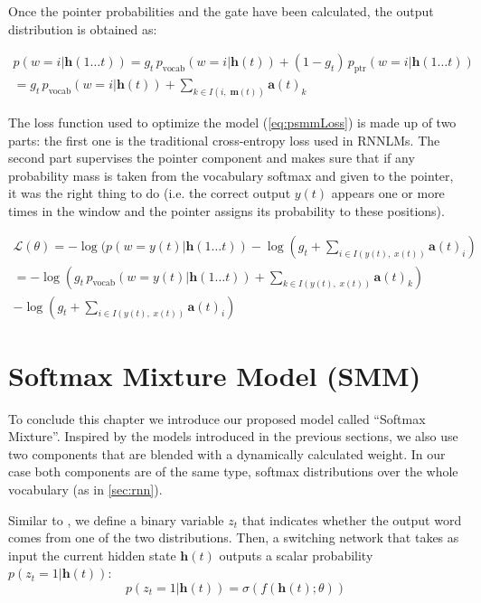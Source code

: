 Once the pointer probabilities and the gate have been calculated, the output distribution is obtained as:

\begin{equation}
	\begin{gathered}
		p(w=i|\mathbf{h}(1\ldots t)) = g_t \, p_{\text{vocab}}(w=i|\mathbf{h}(t)) + (1-g_t) \, p_{\text{ptr}}(w=i|\mathbf{h}(1\ldots t)) \\
		= g_t \, p_{\text{vocab}}(w=i|\mathbf{h}(t)) + \sum_{k \in I(i, \; \mathbf{m}(t))}\mathbf{a}(t)_k
	\end{gathered}
\end{equation}

The loss function used to optimize the model (\autoref{eq:psmmLoss}) is made up of two parts: the first one is the traditional cross-entropy loss used in RNNLMs. The second part supervises the pointer component and makes sure that if any probability mass is taken from the vocabulary softmax and given to the pointer, it was the right thing to do (i.e. the correct output $y(t)$ appears one or more times in the window and the pointer assigns its probability to these positions).

\begin{equation} \label{eq:psmmLoss}
	\begin{gathered}
		\mathcal{L}(\theta) = -\log(p(w=y(t)|\mathbf{h}(1\ldots t)) -\log(g_t + \sum_{i \in I(y(t), \; x(t))}\mathbf{a}(t)_i) \\
		= -\log(g_t \, p_{\text{vocab}}(w=y(t)|\mathbf{h}(1\ldots t)) + \sum_{k \in I(y(t), \; x(t))}\mathbf{a}(t)_k) \\
		-\log(g_t + \sum_{i \in I(y(t), \; x(t))}\mathbf{a}(t)_i)
	\end{gathered}
\end{equation}

\section{Softmax Mixture Model (SMM)}
\label{sec:mixtureModel}

To conclude this chapter we introduce our proposed model called ``Softmax Mixture''. Inspired by the models introduced in the previous sections, we also use two components that are blended with a dynamically calculated weight. In our case both components are of the same type, softmax distributions over the whole vocabulary (as in \autoref{sec:rnn}).

Similar to \cite{gulcehre2016pointing}, we define a binary variable $z_t$ that indicates whether the output word comes from one of the two distributions. Then, a switching network that takes as input the current hidden state $\mathbf{h}(t)$ outputs a scalar probability $p(z_t=1|\mathbf{h}(t))$: 
\begin{equation} \label{eq:probSwitch}
	p(z_t=1|\mathbf{h}(t)) = \sigma(f(\mathbf{h}(t);\theta))
\end{equation}

